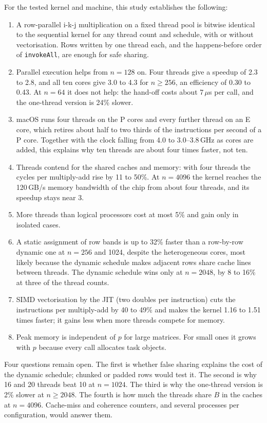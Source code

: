 \documentclass[11pt,a4paper]{article}
\begin{document}
For the tested kernel and machine, this study establishes the following:
\begin{enumerate}
  \item A row-parallel i-k-j multiplication on a fixed thread pool is bitwise
  identical to the sequential kernel for any thread count and schedule, with
  or without vectorisation. Rows written by one thread each, and the
  happens-before order of \texttt{invokeAll}, are enough for safe sharing.
  \item Parallel execution helps from $n=128$ on. Four threads give a speedup
  of 2.3 to 2.8, and all ten cores give 3.0 to 4.3 for $n\ge256$, an efficiency
  of 0.30 to 0.43. At $n=64$ it does not help: the hand-off costs about
  7\,$\mu$s per call, and the one-thread version is 24\% slower.
  \item macOS runs four threads on the P cores and every further thread on an E
  core, which retires about half to two thirds of the instructions per second of
  a P core. Together with the clock falling from 4.0 to 3.0--3.8\,GHz as cores
  are added, this explains why ten threads are about four times faster, not ten.
  \item Threads contend for the shared caches and memory: with four threads the
  cycles per multiply-add rise by 11 to 50\%. At $n=4096$ the kernel reaches the
  120\,GB/s memory bandwidth of the chip from about four threads, and its
  speedup stays near 3.
  \item More threads than logical processors cost at most 5\% and gain only in
  isolated cases.
  \item A static assignment of row bands is up to 32\% faster than a row-by-row
  dynamic one at $n=256$ and 1024, despite the heterogeneous cores, most likely
  because the dynamic schedule makes adjacent rows share cache lines between
  threads. The dynamic schedule wins only at $n=2048$, by 8 to 16\% at three
  of the thread counts.
  \item SIMD vectorisation by the JIT (two doubles per instruction) cuts the
  instructions per multiply-add by 40 to 49\% and makes the kernel 1.16 to 1.51
  times faster; it gains less when more threads compete for memory.
  \item Peak memory is independent of $p$ for large matrices. For small ones
  it grows with $p$ because every call allocates task objects.
\end{enumerate}
Four questions remain open. The first is whether false sharing explains the
cost of the dynamic schedule; chunked or padded rows would test it. The second
is why 16 and 20 threads beat 10 at $n=1024$. The third is why the one-thread
version is 2\% slower at $n\ge2048$. The fourth is how much the threads share
$B$ in the caches at $n=4096$. Cache-miss and coherence counters, and several
processes per configuration, would answer them.
\end{document}
